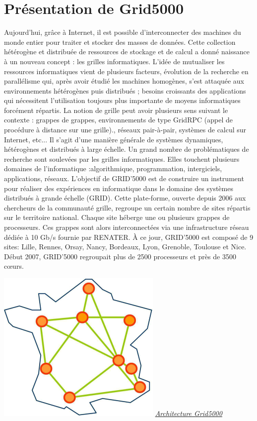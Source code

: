 \section{Présentation de Grid5000}
Aujourd’hui, grâce à Internet, il est possible
d’interconnecter des machines du monde entier pour
traiter et stocker des masses de données. Cette collection
hétérogène et distribuée de ressources de stockage et de
calcul a donné naissance à un nouveau concept : les
grilles informatiques. L’idée de mutualiser les ressources
informatiques vient de plusieurs facteurs, évolution de la
recherche en parallélisme qui, après avoir étudié les
machines homogènes, s’est attaquée aux environnements
hétérogènes puis distribués ; besoins croissants des
applications qui nécessitent l’utilisation toujours plus
importante de moyens informatiques forcément répartis.
La notion de grille peut avoir plusieurs sens suivant le
contexte : grappes de grappes, environnements de type
GridRPC (appel de procédure à distance sur une grille).,
réseaux pair-à-pair, systèmes de calcul sur Internet, etc...
Il s’agit d’une manière générale de systèmes dynamiques,
hétérogènes et distribués à large échelle. Un grand
nombre de problématiques de recherche sont soulevées
par les grilles informatiques. Elles touchent plusieurs
domaines
de l’informatique :algorithmique,
programmation, intergiciels, applications, réseaux.
L’objectif de GRID’5000 est de construire un instrument
pour réaliser des expériences en informatique dans le
domaine des systèmes distribués à grande échelle (GRID).
Cette plate-forme, ouverte depuis 2006 aux chercheurs de
la communauté grille, regroupe un certain nombre de sites
répartis sur le territoire national. Chaque site héberge une
ou plusieurs grappes de processeurs. Ces grappes sont
alors interconnectées via une infrastructure réseau dédiée
à 10 Gb/s fournie par RENATER. À ce jour, GRID’5000
est composé de 9 sites: Lille, Rennes, Orsay, Nancy,
Bordeaux, Lyon, Grenoble, Toulouse et Nice. Début 2007,
GRID’5000 regroupait plus de 2500 processeurs et près
de 3500 cœurs.

\newpage
\begin{center}
\includegraphics{images/g5k.png}
\underline{\textit{Architecture Grid5000}}
\end{center}
